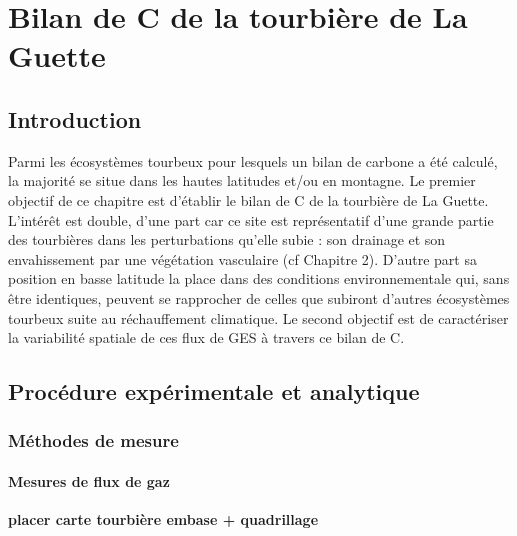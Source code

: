 \chapter{Bilan de C de la tourbière de La Guette}

\minitoc

\newpage

\section{Introduction}

Parmi les écosystèmes tourbeux pour lesquels un bilan de carbone a été calculé, la majorité se situe dans les hautes latitudes \plop et/ou en montagne.
Le premier objectif de ce chapitre est d'établir le bilan de C de la tourbière de La Guette.
L'intérêt est double, d'une part car ce site est représentatif d'une grande partie des tourbières dans les perturbations qu'elle subie : son drainage et son envahissement par une végétation vasculaire (cf Chapitre 2).
D'autre part sa position en basse latitude la place dans des conditions environnementale qui, sans être identiques, peuvent se rapprocher de celles que subiront d'autres écosystèmes tourbeux suite au réchauffement climatique.
Le second objectif est de caractériser la variabilité spatiale de ces flux de GES à travers ce bilan de C.

\section{Procédure expérimentale et analytique}

\subsection{Méthodes de mesure}

\subsubsection{Mesures de flux de gaz}
\textbf{placer carte tourbière embase + quadrillage}

